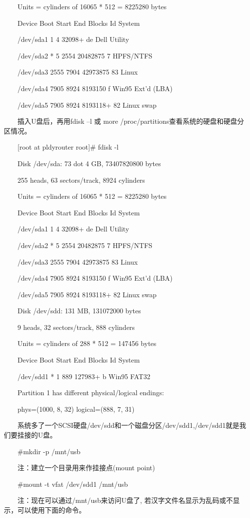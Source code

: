 \documentclass[11pt]{article}
\begin{document}
\begin{enumerate}
　　Units = cylinders of 16065 * 512 = 8225280 bytes

　　Device Boot Start End Blocks Id System

　　/dev/sda1 1 4 32098+ de Dell Utility

　　/dev/sda2 * 5 2554 20482875 7 HPFS/NTFS

　　/dev/sda3 2555 7904 42973875 83 Linux

　　/dev/sda4 7905 8924 8193150 f Win95 Ext'd (LBA)

　　/dev/sda5 7905 8924 8193118+ 82 Linux swap

　　插入U盘后，再用fdisk –l 或 more /proc/partitions查看系统的硬盘和硬盘分区情况。

　　[root at pldyrouter root]\# fdisk -l

　　Disk /dev/sda: 73 dot 4 GB, 73407820800 bytes

　　255 heads, 63 sectors/track, 8924 cylinders

　　Units = cylinders of 16065 * 512 = 8225280 bytes

　　Device Boot Start End Blocks Id System

　　/dev/sda1 1 4 32098+ de Dell Utility

　　/dev/sda2 * 5 2554 20482875 7 HPFS/NTFS

　　/dev/sda3 2555 7904 42973875 83 Linux

　　/dev/sda4 7905 8924 8193150 f Win95 Ext'd (LBA)

　　/dev/sda5 7905 8924 8193118+ 82 Linux swap

　　Disk /dev/sdd: 131 MB, 131072000 bytes

　　9 heads, 32 sectors/track, 888 cylinders

　　Units = cylinders of 288 * 512 = 147456 bytes

　　Device Boot Start End Blocks Id System

　　/dev/sdd1 * 1 889 127983+ b Win95 FAT32

　　Partition 1 has different physical/logical endings:

　　phys=(1000, 8, 32) logical=(888, 7, 31)

　　系统多了一个SCSI硬盘/dev/sdd和一个磁盘分区/dev/sdd1,/dev/sdd1就是我们要挂接的U盘。

　　\#mkdir -p /mnt/usb

　　注：建立一个目录用来作挂接点(mount point)

　　\#mount -t vfat /dev/sdd1 /mnt/usb

　　注：现在可以通过/mnt/usb来访问U盘了, 若汉字文件名显示为乱码或不显示，可以使用下面的命令。


\end{enumerate}
\end{document}
